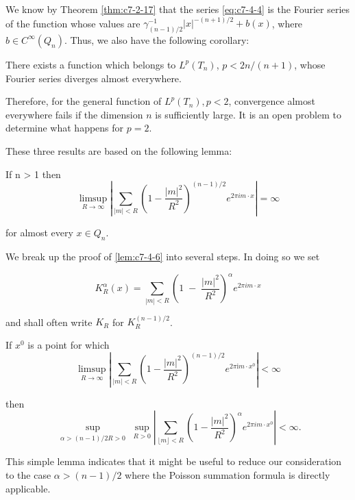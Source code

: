 We know by Theorem \ref{thm:c7-2-17} that the series \eqref{eq:c7-4-4} is the Fourier series of the function whose values are $\gamma_{(n-1)/2}^{-1}|x|^{-(n+1)/2} + b(x)$, where $b \in C^{\infty}(Q_n)$. Thus, we also have the following corollary:

\begin{corollary}
\label{cor:c7-4-5}
There exists a function which belongs to $L^{p}(T_{n})$, $p < 2n/(n + 1)$, whose Fourier series diverges almost everywhere.
\end{corollary}

Therefore, for the general function of $L^{p}(T_{n}), p < 2$, convergence almost everywhere fails if the dimension $n$ is sufficiently large. It is an open problem to determine what happens for $p = 2$.

These three results are based on the following lemma:

\begin{lemma}
\label{lem:c7-4-6}
If n > 1 then
\begin{equation}\label{eq:c7-4-7}
\limsup_{R\to\infty}\left|\sum_{|m|<R}\left(1-\frac{|m|^{2}}{R^{2}}\right)^{(n-1)/2}e^{2\pi im\cdot x}\right|=\infty
\end{equation}

for almost every $x \in Q_{n}$.
\end{lemma}

We break up the proof of \eqref{lem:c7-4-6} into several steps. In doing so we set

\[
K_{R}^{\alpha}(x)=\sum_{|m|<R}\left(1\;-\;\frac{|m|^{2}}{R^{2}}\right)^{\alpha}e^{2\pi i m\cdot x}
\]

and shall often write $K_{R}$ for $K_{R}^{(n-1)/2}$.

\begin{lemma}
\label{lem:c7-4-8}
If $x^{0}$ is a point for which
\[
\limsup_{R\to\infty}\left|\sum_{|m|<R}\left(1-\frac{|m|^{2}}{R^{2}}\right)^{(n-1)/2}e^{2\pi\mathrm{i}m\cdot x^{0}}\right|<\infty
\]

then
\begin{equation}\label{eq:c7-4-9}
\sup_{\substack{\alpha>(n-1)/2R>0}}\sup_{R>0}\left|\sum_{\lfloor m\rfloor<R}\left(1-\frac{\vert m\vert^{2}}{R^{2}}\right)^{\alpha}e^{2\pi i m\cdot x^{0}}\right|<\infty.
\end{equation}

\end{lemma}

This simple lemma indicates that it might be useful to reduce our consideration to the case $\alpha > (n - 1)/2$ where the Poisson summation formula is directly applicable.

